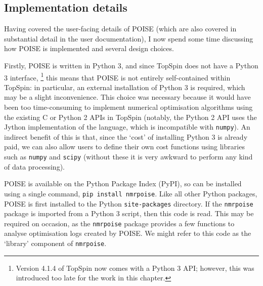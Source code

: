 \subsection{Implementation details}
\label{subsec:poise__implementation}

Having covered the user-facing details of POISE (which are also covered in substantial detail in the user documentation), I now spend some time discussing how POISE is implemented and several design choices.

Firstly, POISE is written in Python 3, and since TopSpin does not have a Python 3 interface,%
\footnote{Version 4.1.4 of TopSpin now comes with a Python 3 API; however, this was introduced too late for the work in this chapter.}
this means that POISE is not entirely self-contained within TopSpin: in particular, an external installation of Python 3 is required, which may be a slight inconvenience.
This choice was necessary because it would have been too time-consuming to implement numerical optimisation algorithms using the existing C or Python 2 APIs in TopSpin (notably, the Python 2 API uses the Jython implementation of the language, which is incompatible with \texttt{numpy}).
An indirect benefit of this is that, since the `cost' of installing Python 3 is already paid, we can also allow users to define their own cost functions using libraries such as \texttt{numpy} and \texttt{scipy} (without these it is very awkward to perform any kind of data processing).

POISE is available on the Python Package Index (PyPI), so can be installed using a single command, \texttt{pip install nmrpoise}.
Like all other Python packages, POISE is first installed to the Python \texttt{site-packages} directory.
If the \texttt{nmrpoise} package is imported from a Python 3 script, then this code is read.
This may be required on occasion, as the \texttt{nmrpoise} package provides a few functions to analyse optimisation logs created by POISE.
We might refer to this code as the `library' component of \texttt{nmrpoise}.

